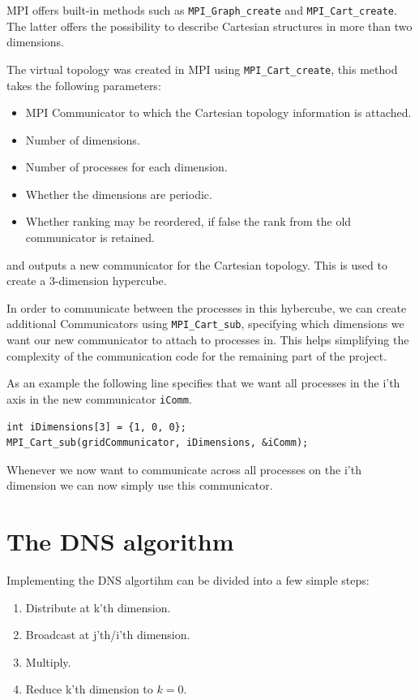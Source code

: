 \documentclass[a4paper,11pt,oneside]{book}
\begin{document}
MPI offers built-in methods such as \verb!MPI_Graph_create! and \verb!MPI_Cart_create!. The latter offers the possibility to describe Cartesian structures in more than two dimensions.

The virtual topology was created in MPI using \verb!MPI_Cart_create!, this method takes the following parameters:
\begin{itemize}
\item MPI Communicator to which the Cartesian topology information is attached.
\item Number of dimensions.
\item Number of processes for each dimension.
\item Whether the dimensions are periodic.
\item Whether ranking may be reordered, if false the rank from the old communicator is retained.
\end{itemize}
and outputs a new communicator for the Cartesian topology. This is used to create a 3-dimension hypercube.

In order to communicate between the processes in this hybercube, we can create additional Communicators using \verb!MPI_Cart_sub!, specifying which dimensions we want our new communicator to attach to processes in. This helps simplifying the complexity of the communication code for the remaining part of the project.

As an example the following line specifies that we want all processes in the i'th axis in the new communicator \verb!iComm!.

\begin{verbatim}
int iDimensions[3] = {1, 0, 0};
MPI_Cart_sub(gridCommunicator, iDimensions, &iComm);
\end{verbatim}

Whenever we now want to communicate across all processes on the i'th dimension we can now simply use this communicator.

\section{The DNS algorithm}
Implementing the DNS algortihm can be divided into a few simple steps:
\begin{enumerate}
\item Distribute at k'th dimension.
\item Broadcast at j'th/i'th dimension.
\item Multiply.
\item Reduce k'th dimension to $k=0$.
\end{enumerate}
\end{document}
